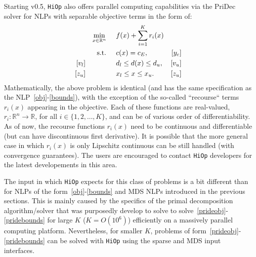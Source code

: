 \documentclass[11pt]{article}
\newcommand{\Hi}{\texttt{HiOp}\xspace}
\begin{document}
Starting v0.5, \Hi also offers parallel computing capabilities via the PriDec solver for NLPs with separable objective terms in the form of:
\begin{align}
&&&&\min_{x\in\mathbb{R}^n} & \hspace{0.5cm} f(x) + \sum_{i=1}^K r_i(x) &&&& \label{prideobj}\\
&&&&\textnormal{s.t.} &\hspace{0.5cm}  c(x)=c_E,  &[y_c]&&&\\
&&[v_l]&&& \hspace{0.5cm} d_l \leq d(x) \leq d_u,  &[v_u]&&&\label{prideineq} \\
&&[z_u]&&& \hspace{0.5cm} x_l \leq x \leq x_u. & [z_u] &&&\label{pridebounds}
\end{align}
Mathematically, the above problem is identical (and has the same specification as the NLP~\eqref{obj}-\eqref{bounds}), with the exception of the so-called ``recourse`` terms $r_i(x)$ appearing in the objective. Each of these functions are real-valued, $r_i:\mathbb{R}^n\rightarrow \mathbb{R}$, for all $i\in\{1,2,\ldots, K\}$, and can be of various order of differentiability. As of now, the recourse functions $r_i(x)$ need to be continuous and differentiable (but can have discontinuous first derivative). It is possible that the more general case in which $r_i(x)$ is only Lipschitz continuous can be still handled (with convergence guarantees). The users are encouraged to contact \Hi developers for the latest developements in this area. 

The input in which \Hi expects for this class of problems is a bit different than for NLPs of the form~\eqref{obj}-\eqref{bounds} and MDS NLPs introduced in the previous sections. This is mainly caused by the specifics of the primal decomposition algorithm/solver that was purposedly develop to solve to solve~\eqref{prideobj}-\eqref{pridebounds} for large $K$ ($K=O(10^6)$) efficiently on a massively parallel computing platform. Nevertheless, for smaller $K$, problems of form~\eqref{prideobj}-\eqref{pridebounds} can be solved with \Hi using the sparse and MDS input interfaces.
\end{document}
